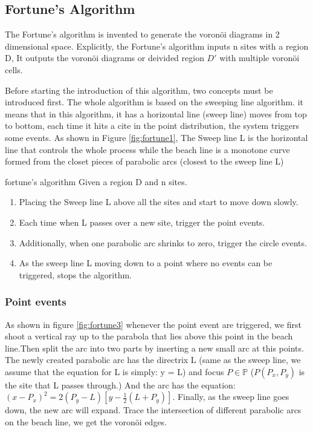 \documentclass[12pt]{article}
\numberwithin{equation}{section}
\let\bb\mathbb
\newenvironment{general}[2][]{\begin{box_for_gene}[#1]{#2}}{\end{box_for_gene}}
\let\bb\mathbb
\begin{document}
	\subsection{Fortune's Algorithm}
		The Fortune's algorithm is invented to generate the voronöi diagrams in 2 dimensional space. Explicitly, the Fortune's algorithm inputs n sites with a region D, It outputs the voronöi diagrams or deivided region $D'$ with multiple voronöi cells.\par 
		
		Before starting the introduction of this algorithm, two concepts must be introduced first. The whole algorithm is based on the sweeping line algorithm. it means that in this algorithm, it has a horizontal line (sweep line) moves from top to bottom, each time it hits a cite in the point distribution, the system triggers some events. As shown in Figure \ref{fig:fortune1}, The Sweep line L is the horizontal line that controls the whole process while the beach line is a monotone curve formed from the closet pieces of parabolic arcs (closest to the sweep line L)\\
		\begin{general}{fortune's algorithm}
			Given a region D and n sites.
			\begin{enumerate}
				\item Placing the Sweep line L above all the sites and start to move down slowly.
				\item Each time when L passes over a new site, trigger the point events.
				\item Additionally, when one parabolic arc shrinks to zero, trigger the circle events.
				\item As the sweep line L moving down to a point where no events can be triggered, stops the algorithm.
			\end{enumerate}
		\end{general}
		
		\subsubsection{Point events}
			As shown in figure \ref{fig:fortune3} whenever the point event are triggered, we first shoot a vertical ray up to the parabola that lies above this point in the beach line.Then split the arc into two parts by inserting a new small arc at this points. The newly created parabolic arc has the directrix L (same as the sweep line, we assume that the equation for L is simply: y = L) and focus $P \in \bb{P}$ ($P(P_x,P_y)$ is the site that L passes through.) And the arc has the equation: $(x-P_x)^2 = 2(P_y-L)[y-\frac{1}{2}(L+P_y)]$. Finally, as the sweep line goes down, the new arc will expand. Trace the intersection of different parabolic arcs on the beach line, we get the voronöi edges.
\end{document}
